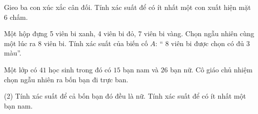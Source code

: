 \begin{vd}
	Gieo ba con xúc xắc cân đối. Tính xác suất để có ít nhất một con xuất hiện mặt $6$ chấm.
\end{vd} 
\begin{vd}
	Một hộp đựng 5  viên bi xanh,  4 viên bi đỏ, 7  viên bi vàng. Chọn ngẫu nhiên cùng một lúc ra 8  viên bi. Tính xác suất của biến cố $A$: “ 8  viên bi được chọn có đủ 3  màu”.
\end{vd} 
\begin{vd}
	Một lớp có $41$ học sinh trong đó có $15$ bạn nam và $26$ bạn nữ. Cô giáo chủ nhiệm chọn ngẫu nhiên ra bốn bạn đi trực ban. 
	\begin{tasks}(2)
		\task Tính xác suất để cả bốn bạn đó đều là nữ.
		\task Tính xác suất để có ít nhất một bạn nam.
	\end{tasks}
\end{vd} 


